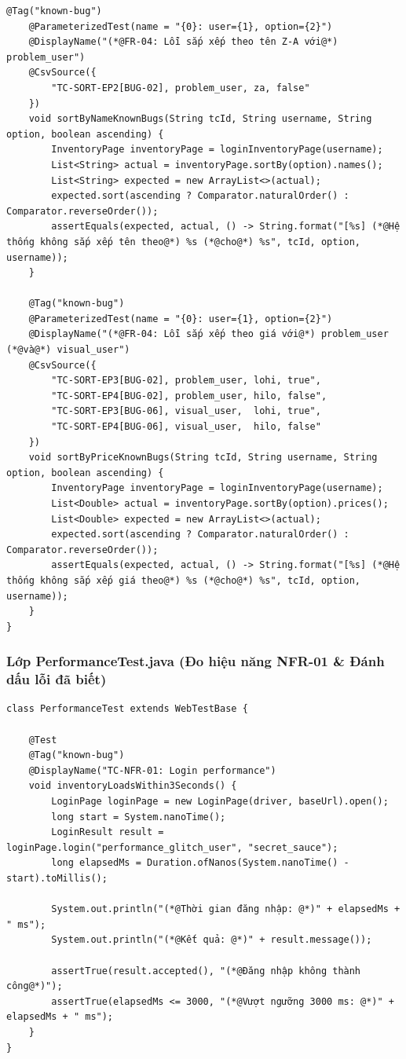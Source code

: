 \documentclass[a4paper]{article}
\begin{document}
\begin{lstlisting}[caption={Trích đoạn mã nguồn lớp SortTest.java}]
    @Tag("known-bug")
    @ParameterizedTest(name = "{0}: user={1}, option={2}")
    @DisplayName("(*@FR-04: Lỗi sắp xếp theo tên Z-A với@*) problem_user")
    @CsvSource({
        "TC-SORT-EP2[BUG-02], problem_user, za, false"
    })
    void sortByNameKnownBugs(String tcId, String username, String option, boolean ascending) {
        InventoryPage inventoryPage = loginInventoryPage(username);
        List<String> actual = inventoryPage.sortBy(option).names();
        List<String> expected = new ArrayList<>(actual);
        expected.sort(ascending ? Comparator.naturalOrder() : Comparator.reverseOrder());
        assertEquals(expected, actual, () -> String.format("[%s] (*@Hệ thống không sắp xếp tên theo@*) %s (*@cho@*) %s", tcId, option, username));
    }

    @Tag("known-bug")
    @ParameterizedTest(name = "{0}: user={1}, option={2}")
    @DisplayName("(*@FR-04: Lỗi sắp xếp theo giá với@*) problem_user (*@và@*) visual_user")
    @CsvSource({
        "TC-SORT-EP3[BUG-02], problem_user, lohi, true",
        "TC-SORT-EP4[BUG-02], problem_user, hilo, false",
        "TC-SORT-EP3[BUG-06], visual_user,  lohi, true",
        "TC-SORT-EP4[BUG-06], visual_user,  hilo, false"
    })
    void sortByPriceKnownBugs(String tcId, String username, String option, boolean ascending) {
        InventoryPage inventoryPage = loginInventoryPage(username);
        List<Double> actual = inventoryPage.sortBy(option).prices();
        List<Double> expected = new ArrayList<>(actual);
        expected.sort(ascending ? Comparator.naturalOrder() : Comparator.reverseOrder());
        assertEquals(expected, actual, () -> String.format("[%s] (*@Hệ thống không sắp xếp giá theo@*) %s (*@cho@*) %s", tcId, option, username));
    }
}
\end{lstlisting}

\subsubsection{Lớp PerformanceTest.java (Đo hiệu năng NFR-01 \& Đánh dấu lỗi đã biết)}
\begin{lstlisting}[caption={Trích đoạn mã nguồn lớp PerformanceTest.java}]
class PerformanceTest extends WebTestBase {

    @Test
    @Tag("known-bug")
    @DisplayName("TC-NFR-01: Login performance")
    void inventoryLoadsWithin3Seconds() {
        LoginPage loginPage = new LoginPage(driver, baseUrl).open();
        long start = System.nanoTime();
        LoginResult result = loginPage.login("performance_glitch_user", "secret_sauce");
        long elapsedMs = Duration.ofNanos(System.nanoTime() - start).toMillis();

        System.out.println("(*@Thời gian đăng nhập: @*)" + elapsedMs + " ms");
        System.out.println("(*@Kết quả: @*)" + result.message());

        assertTrue(result.accepted(), "(*@Đăng nhập không thành công@*)");
        assertTrue(elapsedMs <= 3000, "(*@Vượt ngưỡng 3000 ms: @*)" + elapsedMs + " ms");
    }
}
\end{lstlisting}
\end{document}
